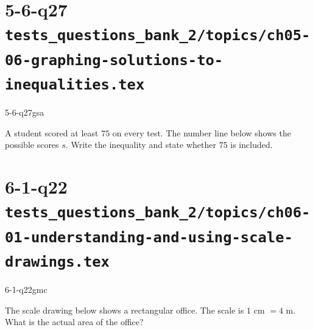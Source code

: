 \documentclass[12pt, fleqn, openany]{studyGuide}
\begin{document}
\section*{5-6-q27 \hfill \normalsize\texttt{tests\_questions\_bank\_2/topics/ch05-06-graphing-solutions-to-inequalities.tex}}
\begin{practiceQuestion}{5-6-q27}{gsa}
\begin{questionText}
A student scored at least $75$ on every test. The number line below shows the possible scores $s$. Write the inequality and state whether $75$ is included.

\begin{center}
\end{center}
\end{questionText}
\end{practiceQuestion}

\newpage
\section*{6-1-q22 \hfill \normalsize\texttt{tests\_questions\_bank\_2/topics/ch06-01-understanding-and-using-scale-drawings.tex}}
\begin{practiceQuestion}{6-1-q22}{gmc}
\begin{questionText}
The scale drawing below shows a rectangular office. The scale is $1$ cm $= 4$ m. What is the actual area of the office?

\begin{center}
\end{center}
\end{questionText}
\end{practiceQuestion}
\end{document}
